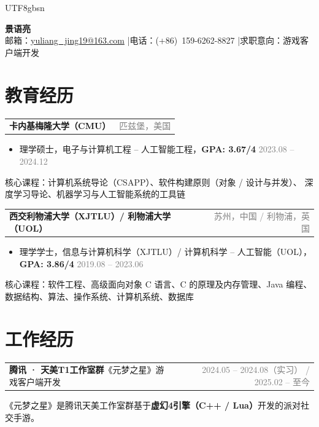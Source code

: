 \documentclass[a4paper, 10.5pt]{article}
\makeatletter
\newcommand{\entryhead}[3]{%
  \noindent
  \begin{tabularx}{\linewidth}{@{}X r@{}}
    \textbf{#1}\enspace #2 & \small\textcolor{gray}{#3}
  \end{tabularx}\vspace{1pt}}
\newcommand{\entryheadsingle}[2]{%
  \noindent
  \begin{tabularx}{\linewidth}{@{}X r@{}}
    \textbf{#1} & \small\textcolor{gray}{#2}
  \end{tabularx}\vspace{1pt}}
\makeatother
\begin{document}
\begin{CJK}{UTF8}{gbsn}   %

\begin{center}
  {\LARGE\bfseries 景语亮}\\[4pt]
  \small
  邮箱：\href{mailto:yuliang_jing19@163.com}{yuliang\_jing19@163.com}
  \enspace|\enspace 电话：(+86)~159-6262-8827
  \enspace|\enspace 求职意向：游戏客户端开发
\end{center}

\section{教育经历}

\small
\entryheadsingle{卡内基梅隆大学（CMU）}{匹兹堡，美国}
\begin{itemize}
  \item 理学硕士，电子与计算机工程 -- 人工智能工程，\textbf{GPA: 3.67/4}
        \hfill \textcolor{gray}{2023.08 -- 2024.12}
\end{itemize}
核心课程：计算机系统导论（CSAPP）、软件构建原则（对象 / 设计与并发）、
        深度学习导论、机器学习与人工智能系统的工具链

\vspace{3pt}

\entryheadsingle{西交利物浦大学（XJTLU）/ 利物浦大学（UOL）}{苏州，中国 / 利物浦，英国}
\begin{itemize}
  \item 理学学士，信息与计算机科学（XJTLU）/ 计算机科学 -- 人工智能（UOL），\textbf{GPA: 3.86/4}
        \hfill \textcolor{gray}{2019.08 -- 2023.06}
\end{itemize}
核心课程：软件工程、高级面向对象 C 语言、C 的原理及内存管理、Java 编程、
数据结构、算法、操作系统、计算机系统、数据库

\section{工作经历}

\entryhead{腾讯 · 天美T1工作室群}{《元梦之星》\quad 游戏客户端开发}{2024.05 -- 2024.08（实习） / 2025.02 -- 至今}

《元梦之星》是腾讯天美工作室群基于\textbf{虚幻4引擎（C++ / Lua）}开发的派对社交手游。


\end{CJK}
\end{document}

